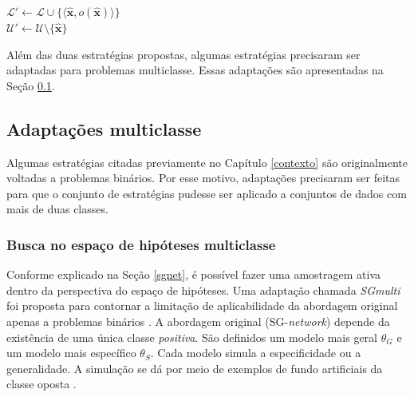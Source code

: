 \begin{algoritmo}
{{  \If{$\rho < \rho_{\limiar}$}{  
   $\bm{\hat{x}} \leftarrow \argmax\limits_{\bm{x}}[\stratIDATU(\bm{x})]$ \\
  }
  \Else {
   $\bm{\hat{x}} \leftarrow \argmax\limits_{\bm{x}}[\stratIDTU(\bm{x})]$ \\
  }
  $\mathcal{L}' \leftarrow \mathcal{L} \cup \{\langle \bm{\hat{x}}, o(\bm{\hat{x}}) \rangle\}$ \\
  $\mathcal{U}' \leftarrow \mathcal{U} \setminus \{\bm{\hat{x}}\}$ \\
  \Return {}
}}
\end{algoritmo}

Além das duas estratégias propostas, algumas estratégias precisaram ser adaptadas para problemas multiclasse.
Essas adaptações são apresentadas na Seção \ref{adapmulti}.

\subsection{Adaptações multiclasse}\label{adapmulti}
Algumas estratégias citadas previamente no Capítulo \ref{contexto} são originalmente voltadas a problemas binários.
Por esse motivo, adaptações precisaram ser feitas para que o conjunto de estratégias pudesse ser aplicado a conjuntos de dados com mais de duas classes.

\subsubsection{Busca no espaço de hipóteses multiclasse}
Conforme explicado na Seção \ref{sgnet}, é possível fazer uma amostragem ativa dentro da perspectiva do espaço de hipóteses.
Uma adaptação chamada \textit{SGmulti} foi proposta para contornar a limitação de aplicabilidade da abordagem original apenas a problemas binários \cite{conf/hais/SantosC14}.
A abordagem original (SG-\textit{network}) depende da existência de uma única classe \textit{positiva}.
São definidos um modelo mais geral $\theta_{G}$ e um modelo mais específico $\theta_{S}$.
Cada modelo simula a especificidade ou a generalidade.
A simulação se dá por meio de exemplos de fundo artificiais da classe oposta \cite{series/synthesis/2012Settles}.

